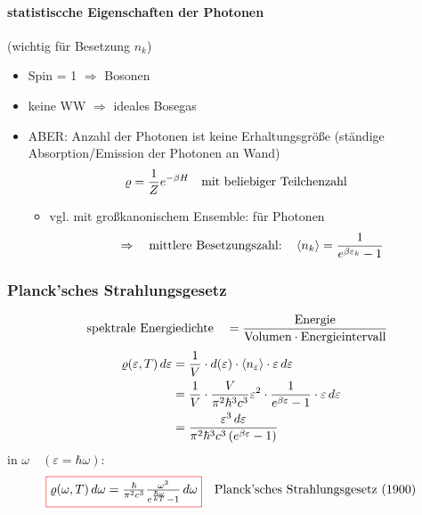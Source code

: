 \paragraph{statistiscche Eigenschaften der Photonen} (wichtig für Besetzung $n_k$)
\begin{itemize}
    \item Spin = 1 $\Rightarrow$ Bosonen
    \item keine WW $\Rightarrow$ ideales Bosegas
    \item ABER: Anzahl der Photonen ist keine Erhaltungsgröße (ständige Absorption/Emission der Photonen an Wand)
    \begin{equation}
        \varrho = \frac{1}{Z} e^{-\beta H} \qq{mit beliebiger Teilchenzahl}
    \end{equation}
    \begin{itemize}
        \item[] vgl. mit großkanonischem Ensemble:  für Photonen
        \begin{equation}
            \Rightarrow \qq{mittlere Besetzungszahl:} \expval{n_k} = \frac{1}{e^{\beta \varepsilon_k}-1}
        \end{equation}
    \end{itemize}
\end{itemize}

\subsubsection{Planck'sches Strahlungsgesetz}
\begin{equation*}
    \qq{spektrale Energiedichte} = \frac{\text{Energie}}{\text{Volumen}\cdot \text{Energieintervall}}
\end{equation*}
\begin{align}
    \varrho(\varepsilon,T) \, d\varepsilon &= \frac{1}{V} \cdot d(\varepsilon) \cdot \expval{n_{\varepsilon}} \cdot \varepsilon \, d\varepsilon\\
    &= \frac{1}{V} \cdot \frac{V}{\pi^2\hbar^3c^3}\varepsilon^2 \cdot \frac{1}{e^{\beta\varepsilon}-1}\cdot \varepsilon \, d\varepsilon\\
    &= \frac{\varepsilon^3 \, d\varepsilon}{\pi^2\hbar^3c^3\left(e^{\beta \varepsilon}-1\right)}
\end{align}
in $\omega\quad(\varepsilon=\hbar\omega)$:
\begin{align}
    \fcolorbox{red}{white}{$\varrho(\omega,T) \, d\omega = \frac{\hbar}{\pi^2c^3}\frac{\omega^3}{e^{\frac{\hbar\omega}{kT}}-1}\,d\omega$} \quad \text{Planck'sches Strahlungsgesetz (1900)}
\end{align}


